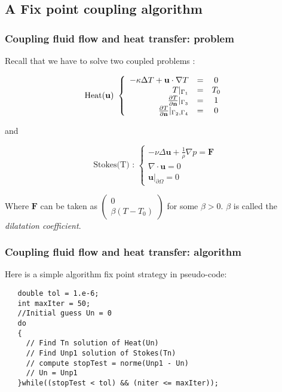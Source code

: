 \subsection{A Fix point coupling algorithm}
\label{sec:coupling-algorithm}

\subsubsection{Coupling fluid flow and heat transfer: problem}
  Recall that we have to solve two coupled problems :

  $$
  \mbox{Heat(\textbf{u}) }\left\{
  \begin{array}{rcc}
    - \kappa\Delta T + \mathbf{u}\cdot\nabla T &=& 0 \\
    T|_{\Gamma_1} &=& T_0 \\
    \frac{\partial T}{\partial \mathbf{n}}|_{\Gamma_3} &=&1 \\
    \frac{\partial T}{\partial \mathbf{n}}|_{\Gamma_2,\Gamma_4} &=& 0
  \end{array}
  \right.
  $$

  and

  $$\mbox{Stokes(T) : }\left\{
    \begin{array}{rcc}
      -\nu\Delta\mathbf{u} +
      \frac{1}{\rho}\nabla p =
      \mathbf{F}\\
      \nabla\cdot\mathbf{u} = 0\\
      \mathbf{u}|_{\partial \Omega} = 0
    \end{array}
  \right.
  $$

Where $\mathbf{F}$ can be taken as $
 \left(
  \begin{array}{c}
    0 \\
    \beta(T-T_0)
  \end{array}
\right)
$
for some $\beta > 0$. $\beta$ is called the \emph{dilatation coefficient}.

\subsubsection{Coupling fluid flow and heat transfer: algorithm}
Here is a simple algorithm fix point strategy in pseudo-code:
\begin{lstlisting}
   double tol = 1.e-6;
   int maxIter = 50;
   //Initial guess Un = 0
   do
   {
     // Find Tn solution of Heat(Un)
     // Find Unp1 solution of Stokes(Tn)
     // compute stopTest = norme(Unp1 - Un)
     // Un = Unp1
   }while((stopTest < tol) && (niter <= maxIter));
\end{lstlisting}

